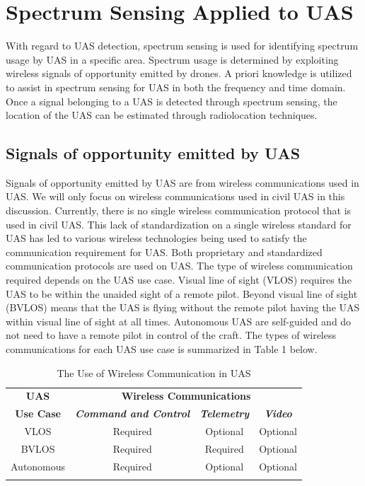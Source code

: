 \documentclass[journal,transmag]{IEEEtran}
\begin{document}
\section{Spectrum Sensing Applied to UAS}
With regard to UAS detection, spectrum sensing is used for identifying spectrum usage by UAS in a specific area.  Spectrum usage is determined by exploiting wireless signals of opportunity emitted by drones. A priori knowledge is utilized to assist in spectrum sensing for UAS in both the frequency and time domain. Once a signal belonging to a UAS is detected through spectrum sensing, the location of the UAS can be estimated through radiolocation techniques.

\subsection{Signals of opportunity emitted by UAS}

Signals of opportunity emitted by UAS are from wireless communications used in UAS. We will only focus on wireless communications used in civil UAS in this discussion.  Currently, there is no single wireless communication protocol that is used in civil UAS. This lack of standardization on a single wireless standard for UAS has led to various wireless technologies being used to satisfy the communication requirement for UAS. Both proprietary and standardized communication protocols are used on UAS.
The type of wireless communication required depends on the UAS use case. Visual line of sight (VLOS) requires the UAS to be within the unaided sight of a remote pilot. Beyond visual line of sight (BVLOS) means that the UAS is flying without the remote pilot having the UAS within visual line of sight at all times. Autonomous UAS are self-guided and do not need to have a remote pilot in control of the craft. The types of wireless communications for each UAS use case is summarized in Table 1 below.

\begin{table}[htbp]
\caption{The Use of Wireless Communication in UAS}
\begin{center}
\begin{tabular}{|c|c|c|c|}
\hline
\textbf{UAS}&\multicolumn{3}{|c|}{\textbf{Wireless Communications}} \\
\cline{2-4} 
\textbf{Use Case} & \textbf{\textit{Command and Control}}& \textbf{\textit{Telemetry}}& \textbf{\textit{Video}} \\
\hline
VLOS& Required& Optional& Optional \\
BVLOS& Required& Required& Optional \\
Autonomous& Required& Optional& Optional \\
\hline
\multicolumn{4}{l}{}
\end{tabular}
\label{tab1}
\end{center}
\end{table}
\end{document}
